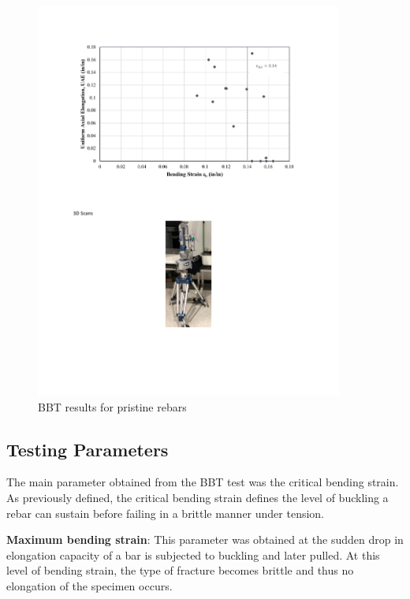 \begin{figure}[htbp]
    \centering
    \includegraphics[width=0.9\textwidth]{VAC Thesis 2.0/Chapter-3/figs/bbt_bendinstrain_cl0.pdf}
    \caption{BBT results for pristine rebars \cite{Barcley2018}}
    \label{fig:BBT_MaxBendingStrain}
\end{figure}

\newpage

\subsection{Testing Parameters}

The main parameter obtained from the BBT test was the critical bending strain. As previously defined, the critical bending strain defines the level of buckling a rebar can sustain before failing in a brittle manner under tension.

\textbf{Maximum bending strain}: This parameter was obtained at the sudden drop in elongation capacity of a bar is subjected to buckling and later pulled. At  this level of bending strain, the type of fracture becomes brittle and thus no elongation of the specimen occurs.

